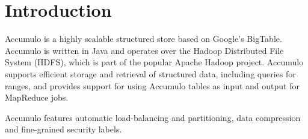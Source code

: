 
%
%

\chapter{Introduction}
Accumulo is a highly scalable structured store based on Google's BigTable.
Accumulo is written in Java and operates over the Hadoop Distributed File System
(HDFS), which is part of the popular Apache Hadoop project. Accumulo supports
efficient storage and retrieval of structured data, including queries for ranges, and
provides support for using Accumulo tables as input and output for MapReduce
jobs.

Accumulo features automatic load-balancing and partitioning, data compression
and fine-grained security labels.

